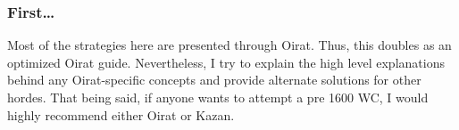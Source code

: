 \begin{frame}
  \frametitle{First\ldots}
  Most of the strategies here are presented through Oirat. Thus, this doubles as
  an optimized Oirat guide. Nevertheless, I try to explain the high level
  explanations behind any Oirat-specific concepts and provide alternate
  solutions for other hordes. That being said, if anyone wants to attempt a pre
  1600 WC, I would highly recommend either Oirat or Kazan.
\end{frame}
